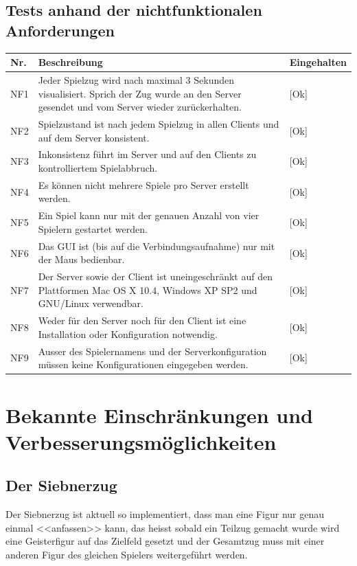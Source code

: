 \documentclass[12pt,halfparskip]{scrartcl}
\begin{document}
\subsection{Tests anhand der nichtfunktionalen Anforderungen}
	\begin {tabular}{l p{11cm} l}
		\toprule
		\textbf{Nr.} & \textbf{Beschreibung} & \textbf{Eingehalten} \\
		\midrule
		NF1 & Jeder Spielzug wird nach maximal 3 Sekunden visualisiert. Sprich der Zug wurde an den Server gesendet und vom Server wieder zurückerhalten. & [Ok] \\
		NF2 & Spielzustand ist nach jedem Spielzug in allen Clients und auf dem Server konsistent. & [Ok] \\
		NF3 & Inkonsistenz führt im Server und auf den Clients zu kontrolliertem Spielabbruch. & [Ok] \\
		NF4 & Es können nicht mehrere Spiele pro Server erstellt werden. & [Ok] \\
		NF5 & Ein Spiel kann nur mit der genauen Anzahl von vier Spielern gestartet werden. & [Ok] \\
		NF6 & Das GUI ist (bis auf die Verbindungsaufnahme) nur mit der Maus bedienbar. & [Ok] \\
		NF7 & Der Server sowie der Client ist uneingeschränkt auf den Plattformen Mac OS X 10.4, Windows XP SP2 und GNU/Linux verwendbar. & [Ok] \\
		NF8 & Weder für den Server noch für den Client ist eine Installation oder Konfiguration notwendig. & [Ok] \\
		NF9 & Ausser des Spielernamens und der Serverkonfiguration müssen keine Konfigurationen eingegeben werden. & [Ok] \\
		\bottomrule
	\end{tabular}

\section{Bekannte Einschränkungen und Verbesserungsmöglichkeiten}
\subsection{Der Siebnerzug}
Der Siebnerzug ist aktuell so implementiert, dass man eine Figur nur genau einmal <<anfassen>> kann, das heisst sobald ein Teilzug gemacht wurde wird eine Geisterfigur auf das Zielfeld gesetzt und der Gesamtzug muss mit einer anderen Figur des gleichen Spielers weitergeführt werden.
\end{document}
